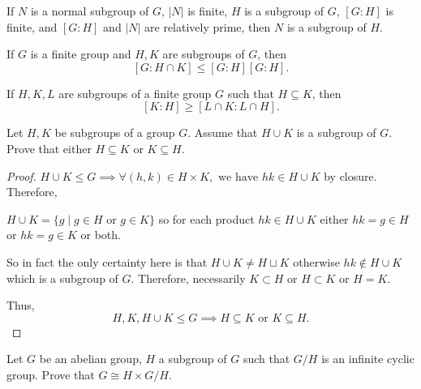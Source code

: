 \documentclass[addpoints,10pt]{exam}
\theoremstyle{plain}
\theoremstyle{definition}
\newtheorem{prob}[thm]{Problem}
\theoremstyle{plain}
\theoremstyle{plain}
\theoremstyle{definition}
\let\oldprob\prob
\let\endoldprob\endprob
\renewenvironment{prob}
  {\begin{singlespace}\oldprob}
  {\endoldprob\end{singlespace}}
\begin{document}
\begin{prob}
If $N$ is a normal subgroup of $G$, $|N|$ is finite, $H$ is a subgroup of $G$, $[G:H]$ is finite, and $[G:H]$ and $|N|$ are relatively prime, then $N$ is a subgroup of $H$.
\end{prob}

\begin{prob}
If $G$ is a finite group and $H,K$ are subgroups of $G$, then
\[
[G:H\cap K] \le [G:H][G:H].
\]
\end{prob}

\begin{prob}
If $H,K,L$ are subgroups of a finite group $G$ such that $H\subseteq K$, then
\[
[K:H] \ge [L\cap K : L\cap H].
\]
\end{prob}
\newpage
\begin{prob}
  Let $H,K$ be subgroups of a group $G$. Assume that $H\cup K$ is a subgroup of $G$. Prove that either $H\subseteq K$ or $K\subseteq H$.
\end{prob}

\begin{proof}
  $H\cup K\leq G\implies \forall (h,k)\in H\times K,\text{ we have }hk\in H\cup K$ by closure. Therefore,
  \begin{center} 
    $H\cup K=\{g\mid g\in H\text{ or }g\in K\}$ so for each product $hk\in H\cup K$ either $hk=g\in H$ or $hk=g\in K$ or both.
  \end{center}
  So in fact the only certainty here is that $H\cup K\neq H\sqcup K$ otherwise $hk\notin H\cup K$ which is a subgroup of $G$. Therefore, necessarily $K\subset H$ or $H\subset K$ or $H=K$.

  Thus,
  $$H,K,H\cup K\leq G\implies H\subseteq K\text{ or }K\subseteq H.$$
\end{proof}
\begin{prob}
Let $G$ be an abelian group, $H$ a subgroup of $G$ such that $G/H$ is an infinite cyclic group. Prove that $G \cong H \times G/H$.
\end{prob}
\end{document}
